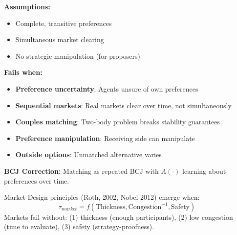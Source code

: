 \begin{tcolorbox}[colback=red!5!white, colframe=red!75!black, title=Boundary Condition: Where Gale-Shapley Fails]
\textbf{Assumptions:}
\begin{itemize}[nosep]
\item Complete, transitive preferences
\item Simultaneous market clearing
\item No strategic manipulation (for proposers)
\end{itemize}

\textbf{Fails when:}
\begin{itemize}[nosep]
\item \textbf{Preference uncertainty}: Agents unsure of own preferences
\item \textbf{Sequential markets}: Real markets clear over time, not simultaneously
\item \textbf{Couples matching}: Two-body problem breaks stability guarantees
\item \textbf{Preference manipulation}: Receiving side can manipulate
\item \textbf{Outside options}: Unmatched alternative varies
\end{itemize}

\textbf{BCJ Correction:} Matching as repeated BCJ with $A(\cdot)$ learning about preferences over time.
\end{tcolorbox}


\begin{theorem}
\label{thm:roth-market-design}
Market Design principles (Roth, 2002, Nobel 2012) emerge when:
\begin{equation}
\boxed{\tau_{market} = f(\text{Thickness}, \text{Congestion}^{-1}, \text{Safety})}
\end{equation}
Markets fail without: (1) thickness (enough participants), (2) low congestion (time to evaluate), (3) safety (strategy-proofness).
\end{theorem}


